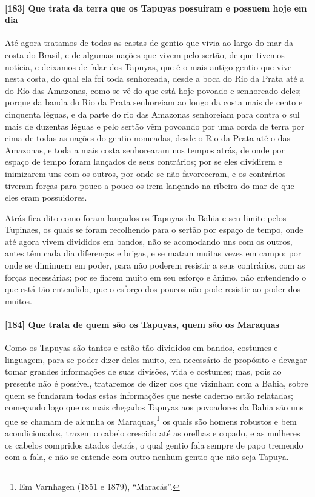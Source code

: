 \begin{linenumbers}
\paragraph{[183] Que trata da terra que os Tapuyas possuíram e possuem hoje em dia}\quad
Até agora tratamos de todas as castas de gentio que vivia ao largo do mar da costa do
Brasil, e de algumas nações que vivem pelo sertão, de que tivemos notícia, e deixamos de
falar dos Tapuyas, que é o mais antigo gentio que vive nesta costa, do qual ela foi toda
senhoreada, desde a boca do Rio da Prata até a do Rio das Amazonas, como se vê do que está
hoje povoado e senhoreado deles; porque da banda do Rio da Prata senhoreiam ao longo da
costa mais de cento e cinquenta léguas, e da parte do rio das Amazonas senhoreiam para
contra o sul mais de duzentas léguas e pelo sertão vêm povoando por uma corda de terra por
cima de todas as nações do gentio nomeadas, desde o Rio da Prata até o das Amazonas, e
toda a mais costa senhorearam nos tempos atrás, de onde por espaço de tempo foram lançados
de seus contrários; por se eles dividirem e inimizarem uns com os outros, por onde se não
favoreceram, e os contrários tiveram forças para pouco a pouco os irem lançando na ribeira
do mar de que eles eram possuidores.

Atrás fica dito como foram lançados os Tapuyas da Bahia e seu limite pelos Tupinaes, os
quais se foram recolhendo para o sertão por espaço de tempo, onde até agora vivem
divididos em bandos, não se acomodando uns com os outros, antes têm cada dia diferenças e
brigas, e se matam muitas vezes em campo; por onde se diminuem em poder, para não poderem
resistir a seus contrários, com as forças necessárias; por se fiarem muito em seu esforço
e ânimo, não entendendo o que está tão entendido, que o esforço dos poucos não pode
resistir ao poder dos muitos.

\paragraph{[184] Que trata de quem são os Tapuyas, quem são os Maraquas}\quad
Como os Tapuyas são tantos e estão tão divididos em bandos, costumes e linguagem, para se
poder dizer deles muito, era necessário de propósito e devagar tomar grandes informações
de suas divisões, vida e costumes; mas, pois ao presente não é possível, trataremos de
dizer dos que vizinham com a Bahia, sobre quem se fundaram todas estas informações que
neste caderno estão relatadas; começando logo que os mais chegados Tapuyas aos povoadores
da Bahia são uns que se chamam de alcunha os Maraquas,\footnote{ Em Varnhagen (1851 e
1879), ``Maracás''.} os quais são homens robustos e bem acondicionados, trazem o cabelo
crescido até as orelhas e copado, e as mulheres os cabelos compridos atados detrás, o qual
gentio fala sempre de papo tremendo com a fala, e não se entende com outro nenhum gentio
que não seja Tapuya.


\end{linenumbers}
